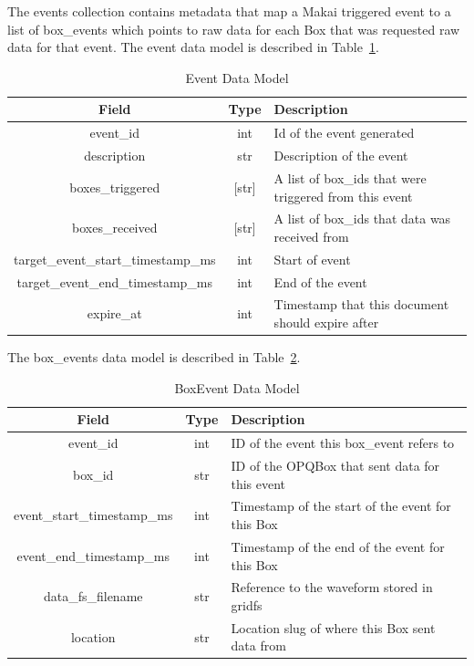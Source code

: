 The events collection contains metadata that map a Makai triggered event to a list of box\_events which points to raw data for each Box that was requested raw data for that event. The event data model is described in Table~\ref{table:Events}.

\begin{table}[H]
	\centering
	\caption{Event Data Model}
	\begin{tabular}{|c|c|p{8cm}|}
		\hline
		Field & Type & Description \\
		\hline
		event\_id & int & Id of the event generated \\
		\hline
		description & str & Description of the event \\
		\hline
		boxes\_triggered & [str] & A list of box\_ids that were triggered from this event \\
		\hline
		boxes\_received & [str] & A list of box\_ids that data was received from \\
		\hline
		target\_event\_start\_timestamp\_ms & int & Start of event \\
		\hline
		target\_event\_end\_timestamp\_ms & int & End of the event \\
		\hline
		expire\_at & int & Timestamp that this document should expire after \\
		\hline
	\end{tabular}
	\label{table:Events}
\end{table}

The box\_events data model is described in Table~\ref{table:BoxEvents}.

\begin{table}[H]
	\centering
	\caption{BoxEvent Data Model}
	\begin{tabular}{|c|c|p{8cm}|}
		\hline
		Field & Type & Description \\
		\hline
		event\_id & int & ID of the event this box\_event refers to \\
		\hline
		box\_id & str & ID of the OPQBox that sent data for this event \\
		\hline
		event\_start\_timestamp\_ms & int & Timestamp of the start of the event for this Box \\
		\hline
		event\_end\_timestamp\_ms & int & Timestamp of the end of the event for this Box \\
		\hline
		data\_fs\_filename & str & Reference to the waveform stored in gridfs \\
		\hline
		location & str & Location slug of where this Box sent data from \\
		\hline
	\end{tabular}
	\label{table:BoxEvents}
\end{table}

